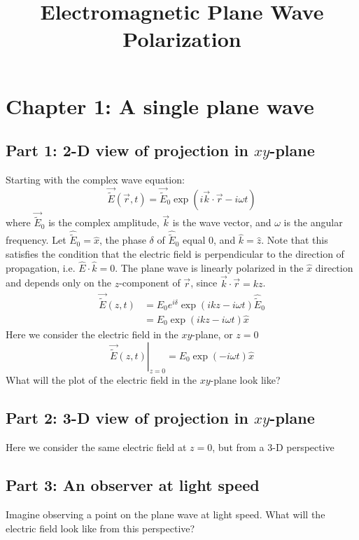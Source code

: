 \documentclass{article}
\title{Electromagnetic Plane Wave Polarization}
\author{}
\date{}
\begin{document}
\maketitle

\section{Chapter 1: A single plane wave}
\subsection{Part 1: 2-D view of projection in $xy$-plane}
Starting with the complex wave equation:
\begin{equation}
    \vec{\widetilde{E}}\left(\vec{r},t\right) = \vec{\widetilde{E}}_0 \exp \left(i \vec{k} \cdot \vec{r} - i \omega t\right)
\end{equation}
where $\vec{\widetilde{E}}_0$ is the complex amplitude, $\vec{k}$ is the wave vector, and $\omega$ is the angular frequency.  Let $\hat{\widetilde{E}}_0 = \hat{x}$,  the phase $\delta$ of $\hat{\widetilde{E}}_0$ equal $0$, and  $\hat{k} = \hat{z}$.  Note that this satisfies the condition that the electric field is perpendicular to the direction of propagation, i.e. $\hat{E} \cdot \hat{k} = 0$.  The plane wave is linearly polarized in the $\hat{x}$ direction and depends only on the $z$-component of $\vec r$, since $\vec{k} \cdot \vec{r} = kz$.
\begin{align}
     \vec{\widetilde{E}}\left(z,t\right) &= E_0 e^{i\delta} \exp \left(i kz - i \omega t\right) \hat{\widetilde{E}}_0\\
     &= E_0 \exp \left(i kz - i \omega t\right) \hat{x}
\end{align}
Here we consider the electric field in the $xy$-plane, or $z=0$
\begin{equation}
     \left.\vec{\widetilde{E}}\left(z,t\right)\right\rvert_{z=0} = E_0 \exp \left(- i \omega t\right) \hat{x}
\end{equation}
What will the plot of the electric field in the $xy$-plane look like?

\subsection{Part 2: 3-D view of projection in $xy$-plane}
Here we consider the same electric field at $z=0$, but from a 3-D perspective

\subsection{Part 3: An observer at light speed}
Imagine observing a point on the plane wave at light speed.  What will the electric field look like from this perspective?
\end{document}
